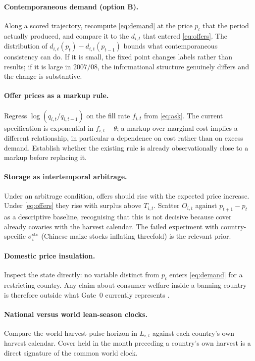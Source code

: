 \paragraph{Contemporaneous demand (option B).}
Along a scored trajectory, recompute \eqref{eq:demand} at the price
\(p_t\) that the period actually produced, and compare it to the \(d_{i,t}\)
that entered \eqref{eq:offers}. The distribution of
\(d_{i,t}(p_t)-d_{i,t}(p_{t-1})\) bounds what contemporaneous consistency
can do. If it is small, the fixed point changes labels rather than
results; if it is large in 2007/08, the informational structure genuinely
differs and the change is substantive.

\paragraph{Offer prices as a markup rule.}
Regress \(\log(q_{i,t}/q_{i,t-1})\) on the fill rate \(f_{i,t}\) from
\eqref{eq:ask}. The current specification is exponential in
\(f_{i,t}-\theta\); a markup over marginal cost implies a different
relationship, in particular a dependence on cost rather than on excess
demand. Establish whether the existing rule is already observationally
close to a markup before replacing it.

\paragraph{Storage as intertemporal arbitrage.}
Under an arbitrage condition, offers should rise with the expected price
increase. Under \eqref{eq:offers} they rise with surplus above
\(T_{i,t}\). Scatter \(O_{i,t}\) against \(p_{t+1}-p_t\) as a descriptive
baseline, recognising that this is not decisive because cover already
covaries with the harvest calendar. The failed experiment with
country-specific \(\sigma^{\mathrm{stu}}_i\) (Chinese maize stocks
inflating threefold) is the relevant prior.

\paragraph{Domestic price insulation.}
Inspect the state directly: no variable distinct from \(p_t\) enters
\eqref{eq:demand} for a restricting country. Any claim about consumer
welfare inside a banning country is therefore outside what Gate~0
currently represents \citep{martin2012}.

\paragraph{National versus world lean-season clocks.}
Compare the world harvest-pulse horizon in \(L_{i,t}\) against each
country's own harvest calendar. Cover held in the month preceding a
country's own harvest is a direct signature of the common world clock.

